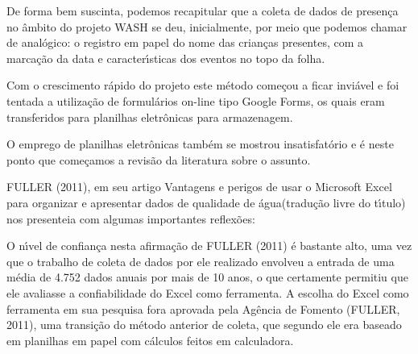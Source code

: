 \documentclass[
12pt,		%
openright,	%
twoside,  %
a4paper,			%
chapter=TITLE,		%
english,			%
french,				%
spanish,			%
brazil				%
]{USPSC-classe/USPSC_RedarTex}
\begin{document}
De forma bem suscinta, podemos recapitular que a coleta de dados de presen\c{c}a no \^ambito do projeto WASH se deu, inicialmente, por meio que podemos chamar de anal\'ogico: o registro em papel do nome das crian\c{c}as presentes, com a marca\c{c}\~ao da data e caracter\'{\i}sticas dos eventos no topo da folha.










Com o crescimento r\'apido do projeto este m\'etodo come\c{c}ou a ficar invi\'avel e foi tentada a utiliza\c{c}\~ao de formul\'arios on-line tipo \textquotedbl Google Forms\textquotedbl , os quais eram transferidos para planilhas eletr\^onicas para armazenagem.










O emprego de planilhas eletr\^onicas tamb\'em se mostrou insatisfat\'orio e \'e neste ponto que come\c{c}amos a revis\~ao da literatura sobre o assunto.










FULLER (2011), em seu artigo \textquotedbl Vantagens e perigos de usar o Microsoft Excel para organizar e apresentar dados de qualidade de \'agua\textquotedbl  (tradu\c{c}\~ao livre do t\'{\i}tulo) nos presenteia com algumas importantes reflex\~oes:











\noindent\begin{center}\mbox{\centering{}}\end{center}


O n\'{\i}vel de confian\c{c}a nesta afirma\c{c}\~ao de  FULLER (2011) \'e bastante alto, uma vez que o trabalho de coleta de dados por ele realizado envolveu a entrada de uma m\'edia de 4.752 dados anuais por mais de 10 anos, o que certamente permitiu que ele avaliasse a confiabilidade do Excel como ferramenta. A escolha do Excel como ferramenta em sua pesquisa fora aprovada pela Ag\^encia de Fomento  (FULLER, 2011), uma transi\c{c}\~ao do m\'etodo anterior de coleta, que segundo ele era baseado em planilhas em papel com c\'alculos feitos em calculadora.
\end{document}
